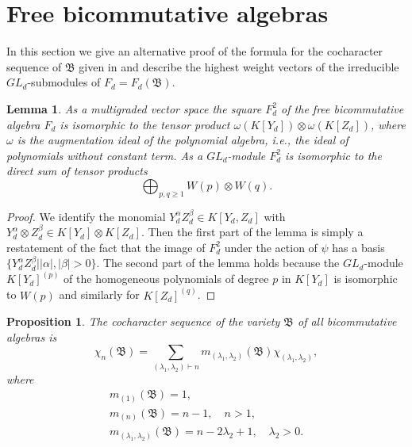 \documentclass{amsart}[12pt]
\newtheorem{lemma}[theorem]{Lemma}
\newtheorem{proposition}[theorem]{Proposition}
\theoremstyle{definition}
\begin{document}
\section{Free bicommutative algebras}
In this section we give an alternative proof of the formula for the cocharacter sequence of $\mathfrak B$ given in \cite{DIT}
and describe the highest weight vectors of the irreducible $GL_d$-submodules of $F_d=F_d({\mathfrak B})$.

\begin{lemma}\label{the graded structure of square of F}
As a multigraded vector space the square $F_d^2$ of the free bicommutative algebra $F_d$ is isomorphic to the tensor product
$\omega(K[Y_d])\otimes\omega(K[Z_d])$, where $\omega$ is the augmentation ideal of the polynomial algebra, i.e., the ideal of polynomials
without constant term. As a $GL_d$-module $F_d^2$ is isomorphic to the direct sum of tensor products
\begin{equation}\label{GL-structure of the square of F}
\bigoplus_{p,q\geq 1}W(p)\otimes W(q).
\end{equation}
\end{lemma}

\begin{proof}
We identify the monomial $Y_d^{\alpha}Z_d^{\beta}\in K[Y_d,Z_d]$ with $Y_d^{\alpha}\otimes Z_d^{\beta}\in K[Y_d]\otimes K[Z_d]$.
Then the first part of the lemma is simply a restatement of the fact that the image of $F_d^2$ under the action of $\psi$ has a basis
$\{Y_d^{\alpha}Z_d^{\beta}\mid\vert\alpha\vert,\vert\beta\vert>0\}$.  The second part of the lemma holds because
the $GL_d$-module $K[Y_d]^{(p)}$ of the homogeneous polynomials of degree $p$ in $K[Y_d]$ is isomorphic to $W(p)$ and similarly for $K[Z_d]^{(q)}$.
\end{proof}

\begin{proposition}\label{the n-th cocharacter of B}\cite{DIT}
The cocharacter sequence of the variety $\mathfrak B$ of all bicommutative algebras is
\[
\chi_n({\mathfrak B})=\sum_{(\lambda_1,\lambda_2)\vdash n}m_{(\lambda_1,\lambda_2)}({\mathfrak B})\chi_{(\lambda_1,\lambda_2)},
\]
where
\begin{equation}\label{multiplicities of cocharacters of B}
\begin{split}
m_{(1)}({\mathfrak B})=1,\\
m_{(n)}({\mathfrak B})=n-1,\quad n>1,\\
m_{(\lambda_1,\lambda_2)}({\mathfrak B})=n-2\lambda_2+1,\quad \lambda_2>0.
\end{split}
\end{equation}
\end{proposition}
\end{document}
